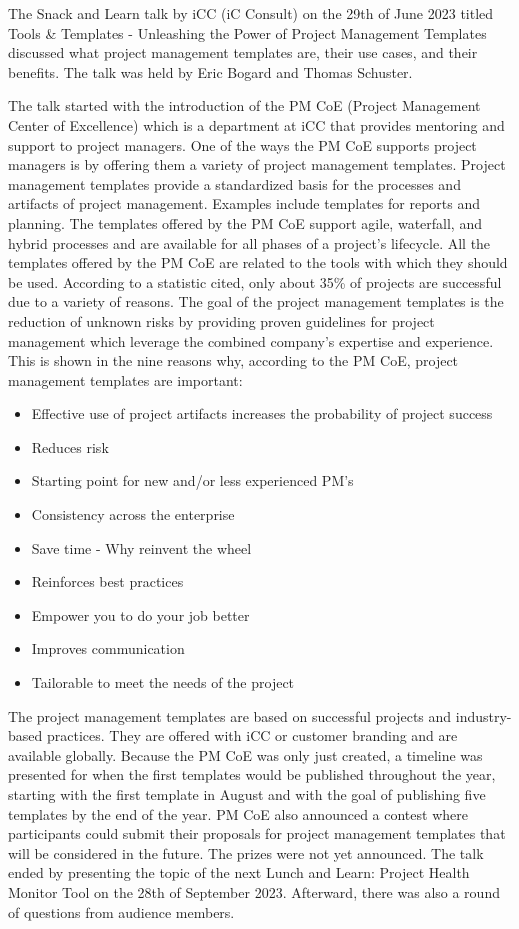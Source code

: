 The Snack and Learn talk by iCC (iC Consult) \cite{ICC-WEB} on the 29th of June 2023
titled Tools \& Templates - Unleashing the Power of Project Management Templates
discussed what project management templates are, their use cases, and their benefits.
The talk was held by Eric Bogard and Thomas Schuster.

The talk started with the introduction of the PM CoE (Project Management Center of Excellence)
which is a department at iCC that provides mentoring and support to project managers.
One of the ways the PM CoE supports project managers is by offering them a variety
of project management templates. Project management templates provide a standardized
basis for the processes and artifacts of project management. Examples include
templates for reports and planning. The templates offered by the PM CoE support
agile, waterfall, and hybrid processes and are available for all phases of
a project's lifecycle. All the templates offered by the PM CoE are related
to the tools with which they should be used. According to a statistic cited, only about 35\% of
projects are successful due to a variety of reasons. The goal of the project management
templates is the reduction of unknown risks by providing proven guidelines
for project management which leverage the combined company's expertise and experience.
This is shown in the nine reasons why, according to the PM CoE, project management templates
are important:
\begin{itemize}
      \item Effective use of project artifacts increases the probability of project success
      \item Reduces risk
      \item Starting point for new and/or less experienced PM's
      \item Consistency across the enterprise
      \item Save time - Why reinvent the wheel
      \item Reinforces best practices
      \item Empower you to do your job better
      \item Improves communication
      \item Tailorable to meet the needs of the project
\end{itemize}
The project management templates are based on successful projects and industry-based
practices. They are offered with iCC or customer branding and are available globally.
Because the PM CoE was only just created, a timeline was presented for when
the first templates would be published throughout the year, starting with the first
template in August and with the goal of publishing five templates by the end of the year.
PM CoE also announced a contest where participants could submit their proposals
for project management templates that will be considered in the future. The prizes
were not yet announced.
The talk ended by presenting the topic of the next Lunch and Learn: Project Health Monitor Tool
on the 28th of September 2023. Afterward, there was also a round of questions from audience members.

